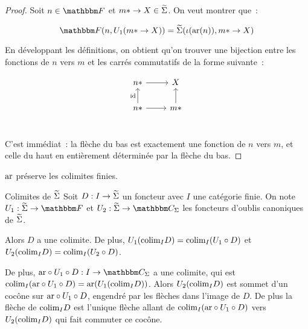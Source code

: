 \begin{proof}
    Soit $n\in\cf$ et $m\ast\rightarrow X\in\widetilde{\Sigma}$. On veut montrer que~:

    \[\cf(n, U_1(m\ast\rightarrow X)) = \tsigma(\iota(\arf(n)), m\ast\rightarrow X)\]

    En développant les définitions, on obtient qu'on trouver une bijection entre
    les fonctions de $n$ vers $m$ et les carrés commutatifs de la forme suivante~:

    \[\begin{tikzcd}
        n\ast\arrow[r] & X \\
        n\ast\arrow[u, "\id"]\arrow[r] & m\ast\arrow[u] \\
    \end{tikzcd}\]

    C'est immédiat~: la flèche du bas est exactement une fonction de $n$ vers $m$,
    et celle du haut en entièrement déterminée par la flèche du bas.
\end{proof}

\begin{cor}
    $\text{ar}$ préserve les colimites finies.
\end{cor}

\begin{theo}{Colimites de $\widetilde{\Sigma}$}
    Soit $D : I\rightarrow\widetilde{\Sigma}$ un foncteur avec $I$ une catégorie finie. On note
    $U_1 : \tsigma\rightarrow\cf$ et $U_2 : \tsigma\rightarrow\C_\Sigma$ les foncteurs
    d'oublis canoniques de $\widetilde{\Sigma}$.

    Alors $D$ a une colimite. De plus, $U_1(\text{colim}_I D) = \text{colim}_I (U_1\circ D)$ et
    $U_2(\text{colim}_I D) = \text{colim}_I (U_2\circ D)$.

    De plus, $\arf\circ U_1\circ D : I\rightarrow\C_\Sigma$ a une colimite, qui
    est $\text{colim}_I (\text{ar}\circ U_1\circ D) = \text{ar}(U_1(\text{colim}_I D))$. Alors
    $U_2(\text{colim}_I D)$ est sommet d'un cocône sur $\text{ar}\circ U_1\circ D$, engendré
    par les flèches dans l'image de $D$. De plus la flèche de $\text{colim}_I D$ est
    l'unique flèche allant de $\text{colim}_I (\text{ar}\circ U_1\circ D)$ vers $U_2(\text{colim}_I D)$
    qui fait commuter ce cocône.
\end{theo}

